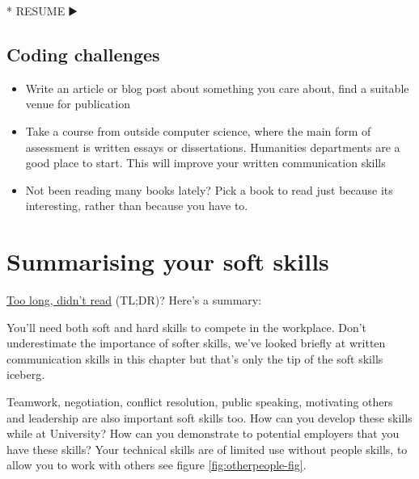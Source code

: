 \documentclass[
]{book}
\newenvironment{Shaded}{\begin{snugshade}}{\end{snugshade}}
\newcommand{\NormalTok}[1]{#1}
\newcommand{\SpecialStringTok}[1]{\textcolor[rgb]{0.31,0.60,0.02}{#1}}
\providecommand{\tightlist}{%
  \setlength{\itemsep}{0pt}\setlength{\parskip}{0pt}}
\begin{document}
\begin{Shaded}
\begin{Highlighting}[]
\SpecialStringTok{* }\NormalTok{RESUME ▶️}
\end{Highlighting}
\end{Shaded}

\hypertarget{cc4}{%
\subsection{Coding challenges}\label{cc4}}

\begin{itemize}
\tightlist
\item
  Write an article or blog post about something you care about, find a suitable venue for publication
\item
  Take a course from outside computer science, where the main form of assessment is written essays or dissertations. Humanities departments are a good place to start. This will improve your written communication skills
\item
  Not been reading many books lately? Pick a book to read just because its interesting, rather than because you have to.
\end{itemize}

\hypertarget{tldr4}{%
\section{Summarising your soft skills}\label{tldr4}}

\href{https://en.wiktionary.org/wiki/too_long;_didn\%27t_read}{Too long, didn't read} (TL;DR)? Here's a summary:

You'll need both soft and hard skills to compete in the workplace. Don't underestimate the importance of softer skills, we've looked briefly at written communication skills in this chapter but that's only the tip of the soft skills iceberg.

Teamwork, negotiation, conflict resolution, public speaking, motivating others and leadership are also important soft skills too. How can you develop these skills while at University? How can you demonstrate to potential employers that you have these skills? Your technical skills are of limited use without people skills, to allow you to work with others see figure \ref{fig:otherpeople-fig}.
\end{document}
